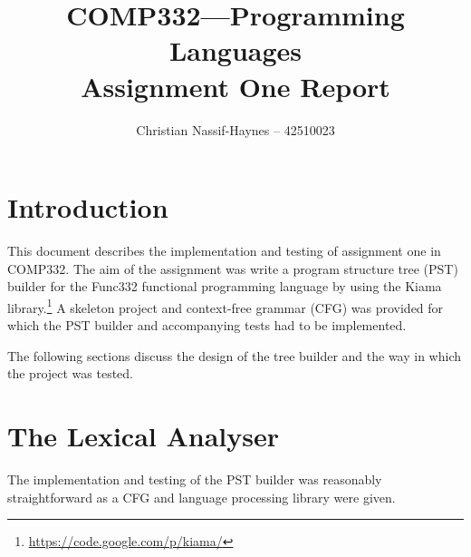 \documentclass[a4paper]{article}
\begin{document}
	\begin{titlepage}
		\title{COMP332---Programming Languages \\[5pt]
		Assignment One Report \vfill}
		\author{Christian Nassif-Haynes -- 42510023}
		\maketitle
	\end{titlepage}
	
	\section{Introduction}
	This document describes the implementation and testing of assignment one in COMP332. The aim of the assignment was write a program structure tree (PST)
	builder for the Func332 functional programming language by using the Kiama library.\footnote{\url {https://code.google.com/p/kiama/}} A skeleton project and context-free grammar (CFG) was provided for which the PST builder and accompanying tests had to be implemented.
	
	The following sections discuss the design of the tree builder and the way in which the project was tested.
	
	\section{The Lexical Analyser}
	The implementation and testing of the PST builder was reasonably straightforward as a CFG and language processing library were given.
\end{document}
